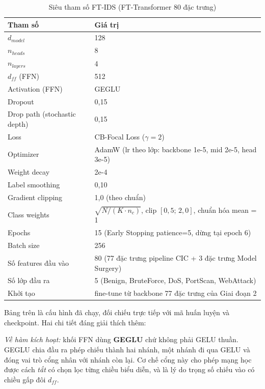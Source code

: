 \documentclass[../DoAn.tex]{subfiles}
\begin{document}
\begin{table}[H]
    \centering
    \caption{Siêu tham số FT-IDS (FT-Transformer 80 đặc trưng)}
    \label{tab:hyp-v85}
    \begin{tabular}{ll}
        \hline
        \textbf{Tham số} & \textbf{Giá trị} \\
        \hline
        $d_{model}$ & 128 \\
        $n_{heads}$ & 8 \\
        $n_{layers}$ & 4 \\
        $d_{ff}$ (FFN) & 512 \\
        Activation (FFN) & GEGLU \\
        Dropout & 0,15 \\
        Drop path (stochastic depth) & 0,15 \\
        Loss & CB-Focal Loss ($\gamma=2$) \\
        Optimizer & AdamW (lr theo lớp: backbone 1e-5, mid 2e-5, head 3e-5) \\
        Weight decay & 2e-4 \\
        Label smoothing & 0,10 \\
        Gradient clipping & 1,0 (theo chuẩn) \\
        Class weights & $\sqrt{N/(K \cdot n_c)}$, clip $[0{,}5;\,2{,}0]$, chuẩn hóa mean = 1 \\
        Epochs & 15 (Early Stopping patience=5, dừng tại epoch 6) \\
        Batch size & 256 \\
        Số features đầu vào & 80 (77 đặc trưng pipeline CIC + 3 đặc trưng Model Surgery) \\
        Số lớp đầu ra & 5 (Benign, BruteForce, DoS, PortScan, WebAttack) \\
        Khởi tạo & fine-tune từ backbone 77 đặc trưng của Giai đoạn 2 \\
        \hline
    \end{tabular}
\end{table}

Bảng trên là cấu hình đã chạy, đối chiếu trực tiếp với mã huấn luyện và checkpoint. Hai chi tiết đáng giải thích thêm:

\textit{Về hàm kích hoạt:} khối FFN dùng \textbf{GEGLU} chứ không phải GELU thuần. GEGLU chia đầu ra phép chiếu thành hai nhánh, một nhánh đi qua GELU và đóng vai trò cổng nhân với nhánh còn lại. Cơ chế cổng này cho phép mạng học được cách \textit{tắt} có chọn lọc từng chiều biểu diễn, và là lý do trọng số chiếu vào có chiều gấp đôi $d_{ff}$.
\end{document}
